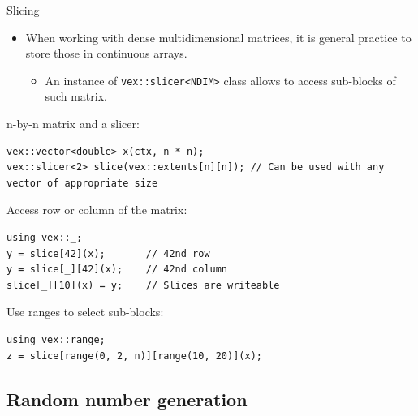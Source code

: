 \documentclass[@BEAMER_OPTIONS@]{beamer}
\newcommand{\code}[1]{\lstinline|#1|}
\begin{document}
\begin{frame}[fragile]{Slicing}
    \begin{itemize}
        \item When working with dense multidimensional matrices, it is general
            practice to store those in continuous arrays.
            \begin{itemize}
                \item An instance of \code{vex::slicer<NDIM>} class allows to
                    access sub-blocks of such matrix.
            \end{itemize}
    \end{itemize}
    \begin{exampleblock}{n-by-n matrix and a slicer:}
        \begin{lstlisting}
vex::vector<double> x(ctx, n * n);
vex::slicer<2> slice(vex::extents[n][n]); // Can be used with any vector of appropriate size
        \end{lstlisting}
    \end{exampleblock}
    \pause
    \begin{exampleblock}{Access row or column of the matrix:}
        \begin{lstlisting}[firstnumber=last]
using vex::_;
y = slice[42](x);       // 42nd row
y = slice[_][42](x);    // 42nd column
slice[_][10](x) = y;    // Slices are writeable
        \end{lstlisting}
    \end{exampleblock}
    \pause
    \begin{exampleblock}{Use ranges to select sub-blocks:}
        \begin{lstlisting}[firstnumber=last]
using vex::range;
z = slice[range(0, 2, n)][range(10, 20)](x);
        \end{lstlisting}
    \end{exampleblock}
\end{frame}

\subsection{Random number generation}
\end{document}
